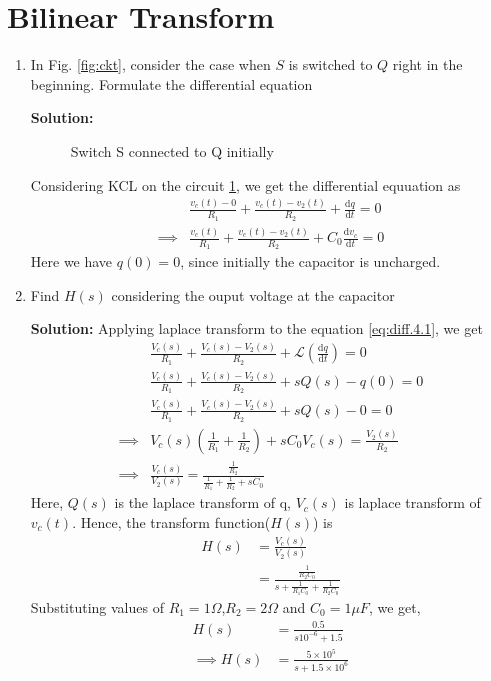\documentclass[journal,12pt,twocolumn]{IEEEtran}
\newcommand{\solution}{\noindent \textbf{Solution: }}
\providecommand{\brak}[1]{\ensuremath{\left(#1\right)}}
\providecommand{\der}[1]{\mathrm{d} #1}
\numberwithin{equation}{section}
\renewcommand\thesection{\arabic{section}}
\begin{document}
	\section{Bilinear Transform}
	\begin{enumerate}[label=\thesection.\arabic*.,ref=\thesection.\theenumi]
		\item In Fig. \ref{fig:ckt}, consider the case when $S$ is switched to $Q$ right in the beginning. Formulate the differential equation
		
		\solution 
		\begin{figure}[!ht]
			\centering
			
			\caption{Switch S connected to Q initially}
			\label{fig:4.1}
		\end{figure}
		Considering KCL on the circuit \ref{fig:4.1}, we get the differential equuation as 
		\begin{align}
			\label{eq:diff.4.1}
			&\frac{v_c(t) - 0}{R_1} + \frac{v_c(t) - v_2(t)}{R_2} + \frac{\der{q}}{\der{t}} = 0 \\
			\implies &\frac{v_c(t)}{R_1} + \frac{v_c(t) - v_2(t)}{R_2} + C_0\frac{\der{v_c}}{\der{t}} = 0
		\end{align}
		Here we have $q(0)=0$, since initially the capacitor is uncharged.
		
		\item Find $H(s)$ considering the ouput voltage at the capacitor
		
		\solution Applying laplace transform to the equation \eqref{eq:diff.4.1}, we get
		\begin{align}
			&\frac{V_c(s)}{R_1} + \frac{V_c(s) - V_2(s)}{R_2} + \mathcal{L}(\frac{\der{q}}{\der{t}})= 0 \\
			&\frac{V_c(s)}{R_1} + \frac{V_c(s) - V_2(s)}{R_2} + sQ(s) - q(0) = 0 \\
			&\frac{V_c(s)}{R_1} + \frac{V_c(s) - V_2(s)}{R_2} + sQ(s) - 0 = 0 \\
			\implies &V_c(s) \brak{\frac{1}{R_1} + \frac{1}{R_2}} + sC_0V_c(s) = \frac{V_2(s)}{R_2} \\
			\implies &\frac{V_c(s)}{V_2(s)} = \frac{\frac{1}{R_2}}{\frac{1}{R_1} + \frac{1}{R_2} + sC_0}
		\end{align}
		Here, $Q(s)$ is the laplace transform of q, $V_c(s)$ is laplace transform of $v_c(t)$.
		Hence, the transform function($H(s)$) is 
		\begin{align}
			H(s) &= \frac{V_c(s)}{V_2(s)} \\
			&=\frac{\frac{1}{R_2C_0}}{s + \frac{1}{R_1C_0} + \frac{1}{R_2C_0}}
		\end{align}
		Substituting values of $R_1=1\Omega$,$R_2=2\Omega$ and $C_0=1\mu F$, we get,
		\begin{align}
			H(s) &= \frac{0.5}{s 10^{-6} + 1.5}\\
			\label{eq:Hs}
			\implies H(s)&=\frac{5 \times 10^5}{s + 1.5 \times 10^6}
		\end{align}
		

\end{enumerate}
\end{document}
